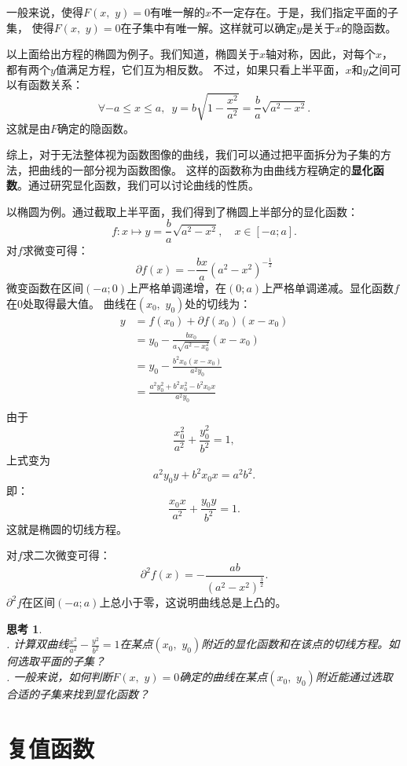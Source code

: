 \documentclass[12pt,UTF8]{ctexbook}
\theoremstyle{definition}
\theoremstyle{plain}
\newtheorem{sk}{思考}[section]
\begin{document}
一般来说，使得$F(x, \,\,y) = 0$有唯一解的$x$不一定存在。于是，我们指定平面的子集，
使得$F(x, \,\,y) = 0$在子集中有唯一解。这样就可以确定$y$是关于$x$的隐函数。

以上面给出方程的椭圆为例子。我们知道，椭圆关于$x$轴对称，因此，对每个$x$，都有两个$y$值满足方程，它们互为相反数。
不过，如果只看上半平面，$x$和$y$之间可以有函数关系：
$$ \forall -a\leqslant x \leqslant a, \,\,\, y = b\sqrt{1 - \frac{x^2}{a^2}}= \frac{b}{a}\sqrt{a^2 - x^2}. $$
这就是由$F$确定的隐函数。

综上，对于无法整体视为函数图像的曲线，我们可以通过把平面拆分为子集的方法，把曲线的一部分视为函数图像。
这样的函数称为由曲线方程确定的\textbf{显化函数}。通过研究显化函数，我们可以讨论曲线的性质。

以椭圆为例。通过截取上半平面，我们得到了椭圆上半部分的显化函数：
$$ f: x\mapsto y = \frac{b}{a}\sqrt{a^2 - x^2}, \quad x \in [-a; a].  $$
对$f$求微变可得：
$$ \partial f(x) = -\frac{bx}{a}(a^2 - x^2)^{-\frac{1}{2}}$$
微变函数在区间$(-a;0)$上严格单调递增，在$(0;a)$上严格单调递减。显化函数$f$在$0$处取得最大值。
曲线在$(x_0,\,\, y_0)$处的切线为：
\begin{align*}
    y &= f(x_0) + \partial f(x_0)(x - x_0) \\
    &= y_0 -\frac{bx_0}{a\sqrt{a^2 - x_0^2}}(x - x_0) \\
    &= y_0 - \frac{b^2x_0(x - x_0)}{a^2y_0} \\
    &= \frac{a^2y_0^2 + b^2x_0^2 - b^2x_0x}{a^2y_0} \\
\end{align*}
由于
$$ \frac{x_0^2}{a^2} + \frac{y_0^2}{b^2} = 1,$$
上式变为
$$ a^2y_0y +  b^2x_0x = a^2b^2. $$
即：
$$ \frac{x_0x}{a^2} + \frac{y_0y}{b^2} = 1.$$
这就是椭圆的切线方程。

对$f$求二次微变可得：
$$ \partial^2 f(x) = -\frac{ab}{(a^2 - x^2)^{\frac{3}{2}} }.$$
$\partial^2 f$在区间$(-a;a)$上总小于零，这说明曲线总是上凸的。

\begin{sk}
    \mbox{} \\
    . 计算双曲线$\frac{x^2}{a^2} - \frac{y^2}{b^2} = 1$在某点$(x_0,\,\,y_0)$附近的显化函数和在该点的切线方程。如何选取平面的子集？\\
    . 一般来说，如何判断$F(x,\,\, y) = 0$确定的曲线在某点$(x_0,\,\,y_0)$附近能通过选取合适的子集来找到显化函数？
\end{sk}

\section{复值函数}
\end{document}
